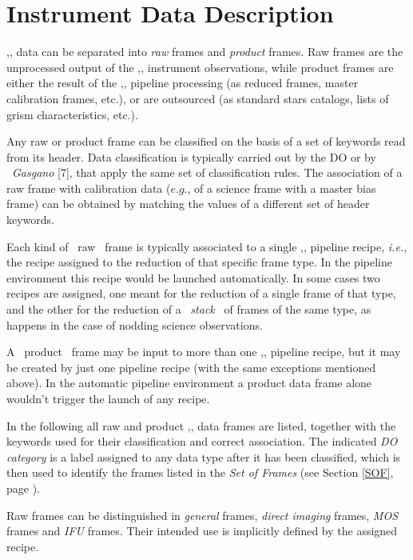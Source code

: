 \section{Instrument Data Description}
\label{DATA}

\pipename,, data can be separated into {\it raw} frames and {\it product} frames.
Raw frames are the unprocessed output of the \pipename,, instrument observations,
while product frames are either the result of the \pipename,, pipeline processing 
(as reduced frames, master calibration frames, etc.), or are outsourced (as 
standard stars catalogs, lists of grism characteristics, etc.).

Any raw or product frame can be classified on the basis of a set of keywords 
read from its header. Data classification is typically carried out by the 
DO or by \ {\it Gasgano} [7], that apply the same set of classification
rules. The 
association of a raw frame with calibration data ($e.g.$, of a science 
frame with a master bias frame) can be obtained by matching the values 
of a different set of header keywords.

Each kind of \ raw \ frame is typically associated to a single \pipename,,
pipeline recipe, {\it i.e.}, the recipe assigned to the reduction of that
specific frame type. In the pipeline environment this recipe would 
be launched automatically. In some cases two recipes are assigned,
one meant for the reduction of a single frame of that type, and the
other for the reduction of a \ {\it stack} \ of frames of the same 
type, as happens in the case of nodding science observations. 

A \ product \ frame may be input to more than one \pipename,, pipeline recipe, 
but it may be created by just one pipeline recipe (with the same
exceptions mentioned above). In the automatic pipeline environment a 
product data frame alone wouldn't trigger the launch of any recipe.

In the following all raw and product \pipename,, data frames are listed,
together with the keywords used for their classification and 
correct association. The indicated {\it DO category} is a 
label assigned to any data type after it has been classified,
which is then used to identify
the frames listed in the {\it Set of Frames} (see Section
\ref{SOF}, page \pageref{SOF}).

\label{DATA:RAW}

Raw frames can be distinguished in {\it general} frames, {\it direct imaging}
frames, {\it MOS} frames and {\it IFU} frames. Their intended use is
implicitly defined by the assigned recipe.




